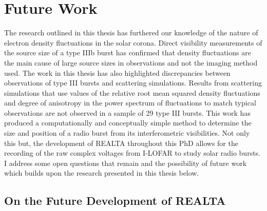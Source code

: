 \section{Future Work}
The research outlined in this thesis has furthered our knowledge of the nature of electron density fluctuations in the solar corona. Direct visibility measurements of the source size of a type IIIb burst has confirmed that density fluctuations are the main cause of large source sizes in observations and not the imaging method used. The work in this thesis has also highlighted discrepancies between observations of type III bursts and scattering simulations. Results from scattering simulations that use values of the relative root mean squared density fluctuations and degree of anisotropy in the power spectrum of fluctuations to match typical observations \citep[e.g.][]{Kontar2017} are not observed in a sample of 29 type III bursts.
This work has produced a computationally and conceptually simple method to determine the size and position of a radio burst from its interferometric visibilities. Not only this but, the development of REALTA throughout this PhD allows for the recording of the raw complex voltages from I-LOFAR to study solar radio bursts. I address some open questions that remain and the possibility of future work which builds upon the research presented in this thesis below.

\subsection{On the Future Development of REALTA}
\label{sec:realta_future_work}

